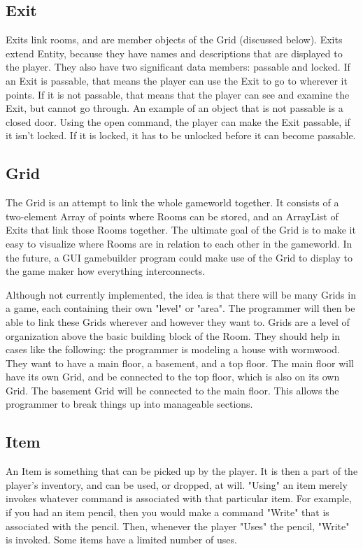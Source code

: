 \documentclass[12pt]{report}
\begin{document}
\subsection{Exit}
Exits link rooms, and are member objects of the Grid (discussed below). Exits 
extend Entity, because they have names and descriptions that are displayed
to the player. They also have two significant data members: passable and 
locked. If an Exit is passable, that means the player can use the Exit
to go to wherever it points. If it is not passable, that means that the
player can see and examine the Exit, but cannot go through. An example of 
an object that is not passable is a closed door. Using the open command, the
player can make the Exit passable, if it isn't locked. If it is locked,
it has to be unlocked before it can become passable.

\subsection{Grid}
The Grid is an attempt to link the whole gameworld together. It consists of a 
two-element Array of points where Rooms can be stored, and an ArrayList of 
Exits that link those Rooms together. The ultimate goal of the Grid is to make
it easy to visualize where Rooms are in relation to each other in the 
gameworld. In the future, a GUI gamebuilder program could make use of the Grid
to display to the game maker how everything interconnects. 

Although not currently implemented, the idea is that there will be many
Grids in a game, each containing their own "level" or "area". The programmer
will then be able to link these Grids wherever and however they want to.
Grids are a level of organization above the basic building block of the Room.
They should help in cases like the following: the programmer is modeling a
house with wormwood. They want to have a main floor, a basement, and a top
floor. The main floor will have its own Grid, and be connected to the top 
floor, which is also on its own Grid. The basement Grid will be connected
to the main floor. This allows the programmer to break things up into
manageable sections.

\subsection{Item}
An Item is something that can be picked up by the player. It is then a part of
the player's inventory, and can be used, or dropped, at will. "Using" an item
merely invokes whatever command is associated with that particular item. For
example, if you had an item pencil, then you would make a command "Write" that
is associated with the pencil. Then, whenever the player "Uses" the pencil,
"Write" is invoked. Some items have a limited number of uses.
\end{document}
